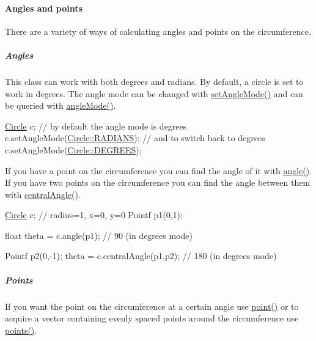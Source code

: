 \paragraph*{Angles and points}

There are a variety of ways of calculating angles and points on the circumference.

\subparagraph*{Angles}

This class can work with both degrees and radians. By default, a circle is set to work in degrees. The angle mode can be changed with \hyperlink{classprism_1_1_circle_a499055061dc996d184dca570ebe8a8ff}{set\+Angle\+Mode()} and can be queried with \hyperlink{classprism_1_1_circle_a0aa261d16ff55088e5695820fa95e09b}{angle\+Mode()}.


\begin{DoxyCode}
\hyperlink{classprism_1_1_circle_aff41793f64e90d15a4d89851b1a6b011}{Circle} c; \textcolor{comment}{// by default the angle mode is degrees}
c.setAngleMode(\hyperlink{classprism_1_1_circle_a74c7c532b4eb120b9227b7fabeffe6aca4e738ac91c0d446d1cd6c0ee11a7baaf}{Circle::RADIANS});
\textcolor{comment}{// and to switch back to degrees}
c.setAngleMode(\hyperlink{classprism_1_1_circle_a74c7c532b4eb120b9227b7fabeffe6aca38d734252b9b86d558359698434cf5d4}{Circle::DEGREES});
\end{DoxyCode}


If you have a point on the circumference you can find the angle of it with \hyperlink{classprism_1_1_circle_ad4b91cf13b593a67abf9782db3fec5d9}{angle()}. If you have two points on the circumference you can find the angle between them with \hyperlink{classprism_1_1_circle_aee1d224313e23f96ae2fcff7abeaf336}{central\+Angle()}.


\begin{DoxyCode}
\hyperlink{classprism_1_1_circle_aff41793f64e90d15a4d89851b1a6b011}{Circle} c; \textcolor{comment}{// radius=1, x=0, y=0}
Pointf p1(0,1);

\textcolor{keywordtype}{float} theta = c.angle(p1); \textcolor{comment}{// 90 (in degrees mode)}

Pointf p2(0,-1);
theta = c.centralAngle(p1,p2); \textcolor{comment}{// 180 (in degrees mode)}
\end{DoxyCode}


\subparagraph*{Points}

If you want the point on the circumference at a certain angle use \hyperlink{classprism_1_1_circle_a42e70e1d37414bf4c22500b80b168c9d}{point()} or to acquire a vector containing evenly spaced points around the circumference use \hyperlink{classprism_1_1_circle_a1443add46fe3c7d3e6c938cf0a43ba57}{points()}.


